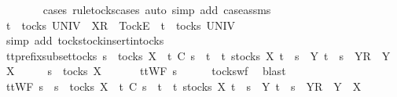 \ \ \ \ \ \ \isamarkupfalse%
\ {\isacharparenleft}cases\ rule{\isacharcolon}tocks{\isachardot}cases{\isacharcomma}\ auto\ simp\ add{\isacharcolon}\ case{\isacharunderscore}assms{\isacharparenleft}{}{\isacharparenright}{\isacharparenright}\isanewline
\ \ \isamarkupfalse%
\isanewline
\ \ \ \ \isamarkupfalse%
\ {\isachardoublequoteopen}t\ {\isasymin}\ tocks\ UNIV\ {\isasymLongrightarrow}\ {\isacharbrackleft}X{\isacharbrackright}\isactrlsub R\ {\isacharhash}\ {\isacharbrackleft}Tock{\isacharbrackright}\isactrlsub E\ {\isacharhash}\ t\ {\isasymin}\ tocks\ UNIV{\isachardoublequoteclose}\isanewline
\ \ \ \ \ \ \isamarkupfalse%
\ {\isacharparenleft}simp\ add{\isacharcolon}\ tocks{\isachardot}tock{\isacharunderscore}insert{\isacharunderscore}in{\isacharunderscore}tocks{\isacharparenright}\isanewline
\ \ \isamarkupfalse%
\isanewline
{}\isamarkupfalse%
%
\endisatagproof
{\isafoldproof}%
%
\isadelimproof
\isanewline
%
\endisadelimproof
\isanewline
{}\isamarkupfalse%
\ tt{\isacharunderscore}prefix{\isacharunderscore}subset{\isacharunderscore}tocks{\isacharcolon}\ {\isachardoublequoteopen}s\ {\isasymin}\ tocks\ X\ {\isasymLongrightarrow}\ t\ {\isasymlesssim}\isactrlsub C\ s\ {\isasymLongrightarrow}\ t\ {\isasymin}\ {\isacharbraceleft}t{\isachardot}\ {\isasymexists}s{\isasymin}tocks\ X{\isachardot}\ t\ {\isacharequal}\ s\ {\isasymor}\ {\isacharparenleft}{\isasymexists}Y{\isachardot}\ t\ {\isacharequal}\ s\ {\isacharat}\ {\isacharbrackleft}{\isacharbrackleft}Y{\isacharbrackright}\isactrlsub R{\isacharbrackright}\ {\isasymand}\ Y\ {\isasymsubseteq}\ X{\isacharparenright}{\isacharbraceright}{\isachardoublequoteclose}\isanewline
%
\isadelimproof
%
\endisadelimproof
%
\isatagproof
{}\isamarkupfalse%
\ {\isacharminus}\isanewline
\ \ \isamarkupfalse%
\ {\isachardoublequoteopen}s\ {\isasymin}\ tocks\ X{\isachardoublequoteclose}\ \isanewline
\ \ \isamarkupfalse%
\ \isamarkupfalse%
\ {\isachardoublequoteopen}ttWF\ s{\isachardoublequoteclose}\isanewline
\ \ \ \ \isamarkupfalse%
\ tocks{\isacharunderscore}wf\ \isamarkupfalse%
\ blast\isanewline
\ \ \isamarkupfalse%
\ \isamarkupfalse%
\ {\isachardoublequoteopen}ttWF\ s\ {\isasymlongrightarrow}\ s\ {\isasymin}\ tocks\ X\ {\isasymlongrightarrow}\ t\ {\isasymlesssim}\isactrlsub C\ s\ {\isasymlongrightarrow}\ t\ {\isasymin}\ {\isacharbraceleft}t{\isachardot}\ {\isasymexists}s{\isasymin}tocks\ X{\isachardot}\ t\ {\isacharequal}\ s\ {\isasymor}\ {\isacharparenleft}{\isasymexists}Y{\isachardot}\ t\ {\isacharequal}\ s\ {\isacharat}\ {\isacharbrackleft}{\isacharbrackleft}Y{\isacharbrackright}\isactrlsub R{\isacharbrackright}\ {\isasymand}\ Y\ {\isasymsubseteq}\ X{\isacharparenright}{\isacharbraceright}{\isachardoublequoteclose}\isanewline
